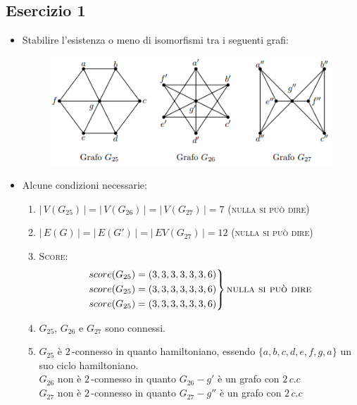 \documentclass[10pt]{article}
\begin{document}
	\subsection{Esercizio 1}
	\begin{itemize}
	\item
	Stabilire l'esistenza o meno di isomorfismi tra i seguenti grafi:
	\begin{center}
		\begin{figure}[h]
		\centering
		\includegraphics[width = 0.7\linewidth]{IsomorfismoEsercizio1}
		\end{figure}
	\end{center}
	\item
	Alcune condizioni necessarie:
	\begin{enumerate}
	\item
	$|\,V(G_{25})\,| = |\,V(G_{26})\,| = |\,V(G_{27})\,| = 7$ (\textsc{nulla si può dire})
	\item
	$|\,E(G)\,| = |\,E(G')\,| = |\,EV(G_{27})\,| = 12$ (\textsc{nulla si può dire})
	\item
	\textsc{Score:}
	\[
		\begin{rcases*}
		score(G_{25}) = (3,3,3,3,3,3,6) \\
		score(G_{25}) = (3,3,3,3,3,3,6) \\
		score(G_{25}) = (3,3,3,3,3,3,6)
		\end{rcases*} \textrm{\textsc{nulla si può dire}}
	\]
	\item
	$G_{25}$, $G_{26}$ e $G_{27}$ sono connessi.
	\item
	$G_{25}$ è $2\,$-connesso in quanto hamiltoniano, essendo $\{a,b,c,d,e,f,g,a\}$ un suo ciclo hamiltoniano.\\
	$G_{26}$ non è $2\,$-connesso in quanto $G_{26} - g'$ è un grafo con $2 \,c.c$ \\
	$G_{27}$ non è $2\,$-connesso in quanto $G_{27} - g''$ è un grafo con $2 \,c.c$ 
\begin{center}
	\begin{figure}[h!]
	  \centering
	  \begin{subfigure}[b]{0.3\linewidth}

\end{subfigure}
\end{figure}
\end{center}
\end{enumerate}
\end{itemize}
\end{document}
